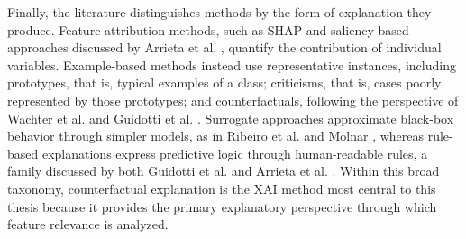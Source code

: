 Finally, the literature distinguishes methods by the form of explanation they produce. Feature-attribution methods, such as SHAP \cite{lundberg2017shap} and saliency-based approaches discussed by Arrieta et al. \cite{arrieta2020explainable}, quantify the contribution of individual variables. Example-based methods instead use representative instances, including prototypes, that is, typical examples of a class; criticisms, that is, cases poorly represented by those prototypes; and counterfactuals, following the perspective of Wachter et al. \cite{wachter2017counterfactual} and Guidotti et al. \cite{guidotti2018survey}. Surrogate approaches approximate black-box behavior through simpler models, as in Ribeiro et al. \cite{ribeiro2016lime} and Molnar \cite{molnar2022iml}, whereas rule-based explanations express predictive logic through human-readable rules, a family discussed by both Guidotti et al. \cite{guidotti2018survey} and Arrieta et al. \cite{arrieta2020explainable}. Within this broad taxonomy, counterfactual explanation is the XAI method most central to this thesis because it provides the primary explanatory perspective through which feature relevance is analyzed.


